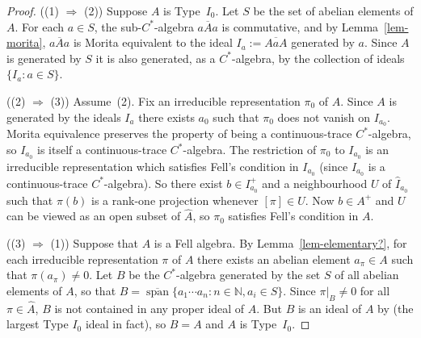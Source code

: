 \documentclass[12pt,a4paper]{amsart}
\newcommand{\field}[1]{\mathbb{#1}}
\newcommand{\NN}{\field{N}}
\newcommand{\lsp}{\operatorname{span}}
\newcommand{\clsp}{\overline{\lsp}}
\begin{document}
\begin{proof}
((1) $\Longrightarrow$ (2)) Suppose $A$ is Type~$I_0$.  Let  $S$ be the set of
abelian elements of $A$.  For each $a\in S$, the sub-$C^*$-algebra
$\overline{aAa}$ is commutative, and by Lemma~\ref{lem-morita},
$\overline{aAa}$ is Morita equivalent to the ideal
$I_a:=\overline{AaA}$ generated by $a$. Since $A$ is generated
by $S$ it is also generated, as a $C^*$-algebra, by the
collection of ideals $\{I_a:a\in S\}$.

((2) $\Longrightarrow$ (3)) Assume~(2). Fix an irreducible
representation $\pi_0$ of $A$. Since $A$ is generated by the
ideals $I_a$ there exists $a_0$ such that $\pi_0$ does not
vanish on $I_{a_0}$. Morita equivalence preserves the property
of being a continuous-trace $C^*$-algebra, so $I_{a_0}$ is
itself a continuous-trace $C^*$-algebra. The restriction of
$\pi_0$ to $I_{a_0}$ is an irreducible representation
which satisfies Fell's condition in $I_{a_0}$ (since $I_{a_0}$
is a continuous-trace $C^*$-algebra). So there exist $b\in
I_{a_0}^+$ and a neighbourhood $U$ of $\widehat{I}_{a_0}$ such
that $\pi(b)$ is a rank-one projection whenever $[\pi]\in U$.
Now $b\in A^+$ and $U$ can be viewed as an open subset of $\hat
A$, so $\pi_0$ satisfies Fell's condition in $A$.

((3) $\Longrightarrow$ (1)) Suppose that $A$ is a Fell algebra.
By Lemma~\ref{lem-elementary?}, for each irreducible
representation $\pi$ of $A$ there exists an abelian element
$a_\pi \in A$ such that $\pi(a_\pi)\neq 0$. Let $B$ be the
$C^*$-algebra generated by the set $S$ of all abelian elements
of $A$, so that $B=\clsp\{a_1\cdots a_n:n\in\NN, a_i\in S\}$.
Since $\pi|_B\neq 0$ for all $\pi\in\widehat{A}$, $B$ is not
contained in any proper ideal of $A$.  But $B$ is an ideal of
$A$ by \cite[6.1.7]{Ped} (the largest Type $I_0$ ideal in fact),
so $B=A$ and $A$ is Type~$I_0$.
\end{proof}
\end{document}

